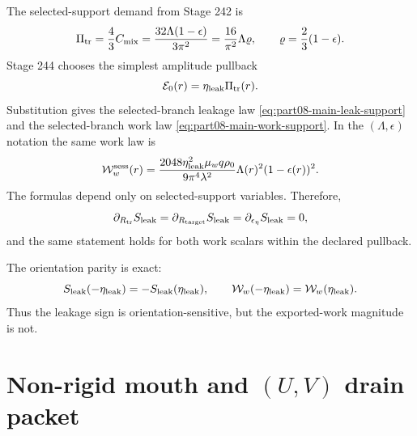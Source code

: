 The selected-support demand from Stage 242 is
\begin{equation}
\label{eq:part08-stage244-pitr}
\Pi_{\rm tr}
=
\frac43C_{\rm mix}
=
\frac{32\Lambda(1-
\epsilon)}{3\pi^2}
=
\frac{16}{\pi^2}\Lambda\varrho,
\qquad
\varrho=\frac23(1-\epsilon).
\end{equation}
Stage 244 chooses the simplest amplitude pullback
\begin{equation}
\label{eq:part08-stage244-e0-pullback}
\mathcal E_0(r)=\eta_{\rm leak}\Pi_{\rm tr}(r).
\end{equation}
Substitution gives the selected-branch leakage law \cref{eq:part08-main-leak-support} and the selected-branch work law \cref{eq:part08-main-work-support}.  In the \((\Lambda,\epsilon)\) notation the same work law is
\begin{equation}
\label{eq:part08-stage244-work-epsilon}
\mathcal W_w^{\rm sess}(r)
=
\frac{2048\eta_{\rm leak}^{2}\mu_wq\rho_0}{9\pi^4\lambda^2}
\Lambda(r)^2(1-\epsilon(r))^2.
\end{equation}
The formulas depend only on selected-support variables.  Therefore,
\begin{equation}
\label{eq:part08-stage244-support-orbit-split}
\partial_{R_{\rm tr}}S_{\rm leak}
=
\partial_{R_{\rm target}}S_{\rm leak}
=
\partial_{\epsilon_\eta}S_{\rm leak}=0,
\end{equation}
and the same statement holds for both work scalars within the declared pullback.

The orientation parity is exact:
\begin{equation}
\label{eq:part08-stage244-parity}
S_{\rm leak}(-\eta_{\rm leak})=-S_{\rm leak}(\eta_{\rm leak}),
\qquad
\mathcal W_w(-\eta_{\rm leak})=\mathcal W_w(\eta_{\rm leak}).
\end{equation}
Thus the leakage sign is orientation-sensitive, but the exported-work magnitude is not.

\section{Non-rigid mouth and \texorpdfstring{\((U,V)\)}{(U,V)} drain packet}
\label{sec:part08_relaxed_branch:non-rigid-mouth-and-u-v-drain-packet}

